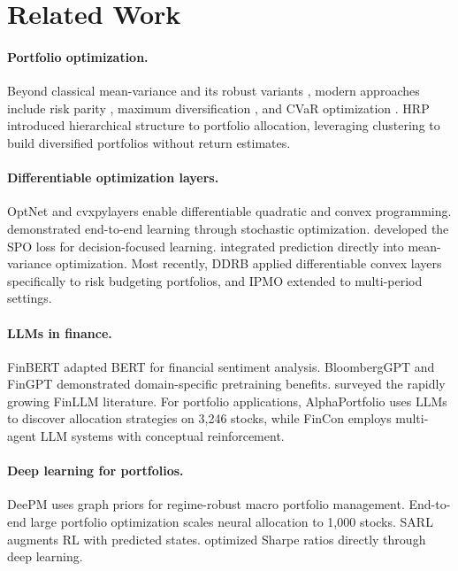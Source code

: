 \documentclass[11pt]{article}
\begin{document}
\section{Related Work}

\paragraph{Portfolio optimization.} Beyond classical mean-variance \citep{Markowitz1952} and its robust variants \citep{Black1992}, modern approaches include risk parity \citep{Maillard2010}, maximum diversification \citep{Choueifaty2008}, and CVaR optimization \citep{Rockafellar2000}. HRP \citep{LopezdePrado2016} introduced hierarchical structure to portfolio allocation, leveraging clustering to build diversified portfolios without return estimates.

\paragraph{Differentiable optimization layers.} OptNet \citep{Amos2017} and cvxpylayers \citep{Agrawal2019} enable differentiable quadratic and convex programming. \citet{Donti2017} demonstrated end-to-end learning through stochastic optimization. \citet{Elmachtoub2022} developed the SPO loss for decision-focused learning. \citet{Butler2023} integrated prediction directly into mean-variance optimization. Most recently, DDRB \citep{ParraDiaz2025} applied differentiable convex layers specifically to risk budgeting portfolios, and IPMO \citep{Uysal2025} extended to multi-period settings.

\paragraph{LLMs in finance.} FinBERT \citep{Araci2019} adapted BERT for financial sentiment analysis. BloombergGPT \citep{Wu2023} and FinGPT \citep{Yang2023} demonstrated domain-specific pretraining benefits. \citet{Li2025} surveyed the rapidly growing FinLLM literature. For portfolio applications, AlphaPortfolio \citep{Cong2025} uses LLMs to discover allocation strategies on 3,246 stocks, while FinCon \citep{Yu2024} employs multi-agent LLM systems with conceptual reinforcement.

\paragraph{Deep learning for portfolios.} DeePM \citep{Lohre2026} uses graph priors for regime-robust macro portfolio management. End-to-end large portfolio optimization \citep{CastroIragorri2025} scales neural allocation to 1,000 stocks. SARL \citep{Ye2020} augments RL with predicted states. \citet{Zhang2020} optimized Sharpe ratios directly through deep learning.
\end{document}
